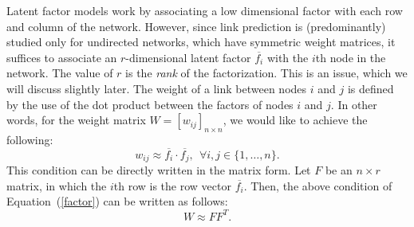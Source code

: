 Latent factor models work by associating a low dimensional factor
with each row and column of the network. However, since link
prediction is (predominantly) studied only for undirected networks,
which have symmetric weight matrices, it suffices to associate an
$r$-dimensional latent factor $\overline{f_i}$ with the $i$th node
in the network. The value of $r$ is the {\em rank} of the
factorization. This is an issue, which we will discuss slightly
later.  The weight of a link between nodes $i$ and $j$ is defined by
the use of the dot product between the factors of nodes $i$ and $j$.
In other words, for the weight matrix $W= [w_{ij}]_{n\times n}$, we
would like to achieve the following:
\begin{equation}
w_{ij} \approx \overline{f_i} \cdot \overline{f_j}, \ \ \forall i, j
\in \{ 1, \ldots, n \} \label{factor}.
\end{equation}
This condition can be directly written in the matrix form. Let $F$ be an
$n \times r$ matrix, in which the $i$th row is the row vector
$\overline{f_i}$. Then, the above condition of
Equation~(\ref{factor}) can be written as follows:
\begin{equation}
W \approx F F^T.
\end{equation}




